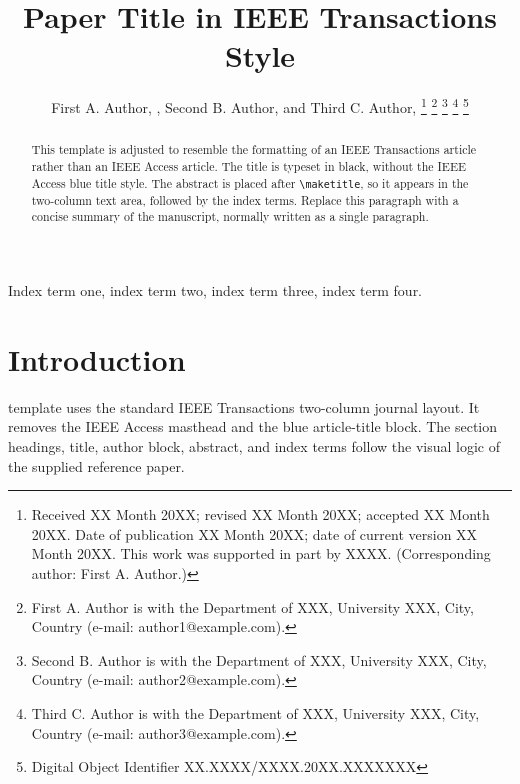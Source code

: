 \documentclass[journal,twoside]{IEEEtran}
\begin{document}
\title{Paper Title in IEEE Transactions Style}

\author{First A. Author, ,
        Second B. Author, and Third C. Author, %
\thanks{Received XX Month 20XX; revised XX Month 20XX; accepted XX Month 20XX. Date of publication XX Month 20XX; date of current version XX Month 20XX. This work was supported in part by XXXX. (Corresponding author: First A. Author.)}%
\thanks{First A. Author is with the Department of XXX, University XXX, City, Country (e-mail: author1@example.com).}%
\thanks{Second B. Author is with the Department of XXX, University XXX, City, Country (e-mail: author2@example.com).}%
\thanks{Third C. Author is with the Department of XXX, University XXX, City, Country (e-mail: author3@example.com).}%
\thanks{Digital Object Identifier XX.XXXX/XXXX.20XX.XXXXXXX}}

\maketitle

\begin{abstract}
This template is adjusted to resemble the formatting of an IEEE Transactions article rather than an IEEE Access article. The title is typeset in black, without the IEEE Access blue title style. The abstract is placed after \verb|\maketitle|, so it appears in the two-column text area, followed by the index terms. Replace this paragraph with a concise summary of the manuscript, normally written as a single paragraph.
\end{abstract}

\begin{IEEEkeywords}
Index term one, index term two, index term three, index term four.
\end{IEEEkeywords}

\section{Introduction}
\label{sec:introduction}
 template uses the standard IEEE Transactions two-column journal layout. It removes the IEEE Access masthead and the blue article-title block. The section headings, title, author block, abstract, and index terms follow the visual logic of the supplied reference paper.
\end{document}
